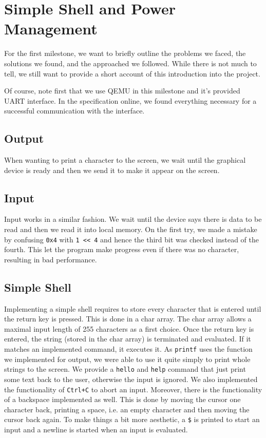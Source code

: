 \chapter{Simple Shell and Power Management}
For the first milestone, we want to briefly outline the problems we faced,
the solutions we found, and the approached we followed. 
While there is not much to tell, we still want to provide a short account of this introduction into the project.

Of course, note first that we use QEMU in this milestone and it's provided UART interface.
In the specification online, we found everything necessary for a successful communication with the interface.

\section{Output}
When wanting to print a character to the screen, we wait until the graphical device is
ready and then we send it to make it appear on the screen.

\section{Input}
Input works in a similar fashion. We wait until the device says there is data to
be read and then we read it into local memory.  On the first try, we made a mistake by
confusing \texttt{0x4} with \texttt{1 << 4} and hence the third bit was checked instead of the
fourth. This let the program make progress even if there was no character,
resulting in bad performance.

\section{Simple Shell}
Implementing a simple shell requires to store every character that is entered
until the return key is pressed. This is done in a char array. The char array
allows a maximal input length of 255 characters as a first choice.  Once the return key is
entered, the string (stored in the char array) is terminated and evaluated. If
it matches an implemented command, it executes it.  As \texttt{printf} uses the function
we implemented for output, we were able to use it quite simply to print whole strings to the screen. 
We provide a \texttt{hello} and \texttt{help} command that just print some text back to the user,
otherwise the input is ignored. We also implemented the functionality of \texttt{Ctrl+C}
to abort an input. Moreover, there is the functionality of a backspace implemented
as well. This is done by moving the cursor one character back, printing a space, 
i.e. an empty character and then moving the cursor back again. To make
things a bit more aesthetic, a \texttt{\$} is printed to start an input and a newline is
started when an input is evaluated.

